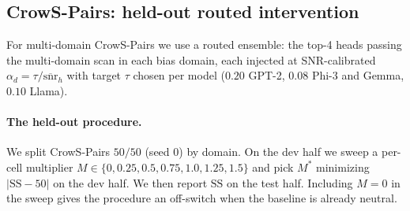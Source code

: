 \subsection{CrowS-Pairs: held-out routed intervention}
\label{sec:downstream:crows}

For multi-domain CrowS-Pairs we use a routed ensemble: the top-4
heads passing the multi-domain scan in each bias domain, each
injected at SNR-calibrated $\alpha_d = \tau /
\overline{\mathrm{snr}}_h$ with target $\tau$ chosen per model
($0.20$ GPT-2, $0.08$ Phi-3 and Gemma, $0.10$ Llama).

\paragraph{The held-out procedure.}
We split CrowS-Pairs $50/50$ (seed 0) by domain. On the dev half we
sweep a per-cell multiplier $M \in \{0, 0.25, 0.5, 0.75, 1.0, 1.25,
1.5\}$ and pick $M^*$ minimizing $|\mathrm{SS} - 50|$ on the dev
half. We then report $\mathrm{SS}$ on the test half. Including
$M = 0$ in the sweep gives the procedure an off-switch when the
baseline is already neutral.

